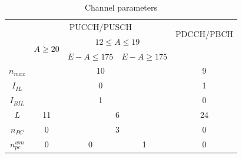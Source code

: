 \begin{table}[!h]
	\caption{Channel parameters \cite{DesignOfPolarCodes5G}}
	\label{tab:FecChainParameters}
	\begin{tabular}{c|c|c|c|c|}
		\cline{2-5}
		\multirow{3}{*}{}               & \multicolumn{3}{c|}{PUCCH/PUSCH}                                                         & \multirow{2}{*}{PDCCH/PBCH} \\ \cline{2-4}
		& \multirow{2}{*}{$A\geq20$} & \multicolumn{2}{c|}{$12\leq A\leq 19$} &                             \\ \cline{3-5} 
		&                                     & $E-A \leq 175$     & $E-A \geq 175$    &                             \\ \hline
		\multicolumn{1}{|c|}{$n_{max}$}      & \multicolumn{3}{c|}{10}                                                                  & 9                           \\ \hline
		\multicolumn{1}{|c|}{$I_{IL}$}       & \multicolumn{3}{c|}{0}                                                                   & 1                           \\ \hline
		\multicolumn{1}{|c|}{$I_{BIL}$}      & \multicolumn{3}{c|}{1}                                                                   & 0                           \\ \hline
		\multicolumn{1}{|c|}{$L$}         & 11                                  & \multicolumn{2}{c|}{6}                             & 24                          \\ \hline
		\multicolumn{1}{|c|}{$n_{PC}$}     & 0                                   & \multicolumn{2}{c|}{3}                             & 0                           \\ \hline
		\multicolumn{1}{|c|}{$n_{pc}^{wm}$} & 0                                   & 0                       & 1                        & 0                           \\ \hline
	\end{tabular}
\end{table}